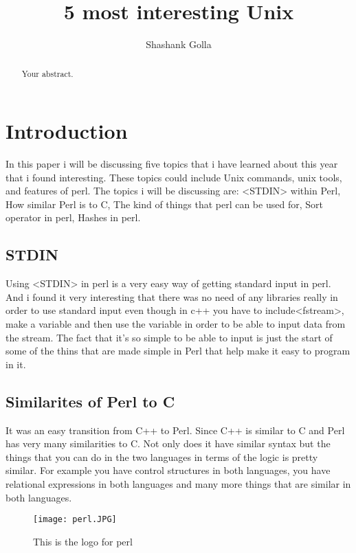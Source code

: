 \documentclass[a4paper,11pt]{article}
\title{5 most interesting Unix}
\author{Shashank Golla}
\begin{document}
\maketitle

\begin{abstract}
Your abstract.
\end{abstract}

\section{Introduction}
In this paper i will be discussing five topics that i have learned about this year that i found interesting. These topics could include Unix commands, unix tools, and features of perl. The topics i will be discussing are: <STDIN> within Perl, How similar Perl is to C, The kind of things that perl can be used for, Sort operator in perl, Hashes in perl. 
\label{sec:examples}

\subsection{STDIN}

Using <STDIN> in perl is a very easy way of getting standard input in perl. And i found it very interesting that there was no need of any libraries really in order to use standard input even though in c++ you have to include<fstream>, make a variable and then use the variable in order to be able to input data from the stream. The fact that it's so simple to be able to input is just the start of some of the thins that are made simple in Perl that help make it easy to program in it.

\subsection{Similarites of Perl to C}

It was an easy transition from C++ to Perl. Since C++ is similar to C and Perl has very many similarities to C. Not only does it have similar syntax but the things that you can do in the two languages in terms of the logic is pretty similar. For example you have control structures in both languages, you have relational expressions in both languages and many more things that are similar in both languages. 

\begin{figure}
\centering
\texttt{[image: perl.JPG]}
\caption{\label{fig:frog}This is the logo for perl}
\end{figure}
\end{document}

